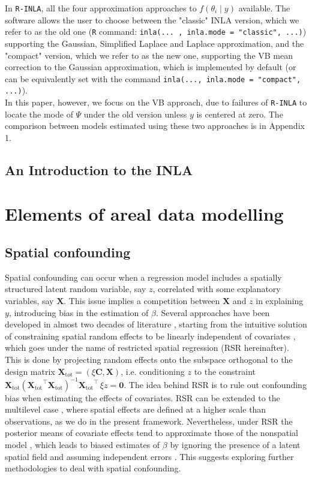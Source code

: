 \documentclass{book}
\begin{document}
In \texttt{R-INLA}, all the four approximation approaches to $f(\theta_i \mid y)$ available. The software allows the user to choose between the "classic" INLA version, which we refer to as the old one (\texttt{R} command: \texttt{inla(... , inla.mode = "classic", ...)}) supporting the Gaussian, Simplified Laplace and Laplace approximation, and the "compact" version, which we refer to as the new one, supporting the VB mean correction to the Gaussian approximation, which is implemented by default (or can be equivalently set with the command \texttt{inla(..., inla.mode = "compact", ...)}).\\
In this paper, however, we focus on the VB approach, due to failures of \texttt{R-INLA} to locate the mode of $\Psi$ under the old version unless $y$ is centered at zero. The comparison between models estimated using these two approaches is in Appendix 1.



\section{An Introduction to the INLA}

\chapter{Elements of areal data modelling} \label{chapter:theory}

\section{Spatial confounding}



Spatial confounding can occur when a regression model includes a spatially structured latent random variable, say $z$, correlated with some explanatory variables, say $\mathbf{X}$. This issue implies a competition between $\mathbf{X}$ and $z$ in explaining $y$, introducing bias in the estimation of $\beta$. Several approaches have been developed in almost two decades of literature \citep{Urdangarin23, DupontArXiv}, starting from the intuitive solution of constraining spatial random effects to be linearly independent of covariates \citep{RHZ, Hodges}, which goes under the name of restricted spatial regression (RSR hereinafter). This is done by projecting random effects onto the subspace orthogonal to the design matrix $\mathbf{X_\mathrm{tot}} = (\xi\mathbf{C}, \mathbf{X})$, i.e. conditioning $z$ to the constraint $\mathbf{X_\mathrm{tot}}(\mathbf{X_\mathrm{tot}}^{\top}\mathbf{X_\mathrm{tot}})^{-1}\mathbf{X_\mathrm{tot}}^{\top} \, \xi z = \mathbf{0}$. The idea behind RSR is to rule out confounding bias when estimating the effects of covariates. RSR can be extended to the multilevel case \citep{Nobre}, where spatial effects are defined at a higher scale than observations, as we do in the present framework. Nevertheless, under RSR the posterior means of covariate effects tend to approximate those of the nonspatial model \citep{Khan}, which leads to biased estimates of $\beta$ by ignoring the presence of a latent spatial field and assuming independent errors \citep{DupontArXiv}.
This suggests exploring further methodologies to deal with spatial confounding.
\end{document}
